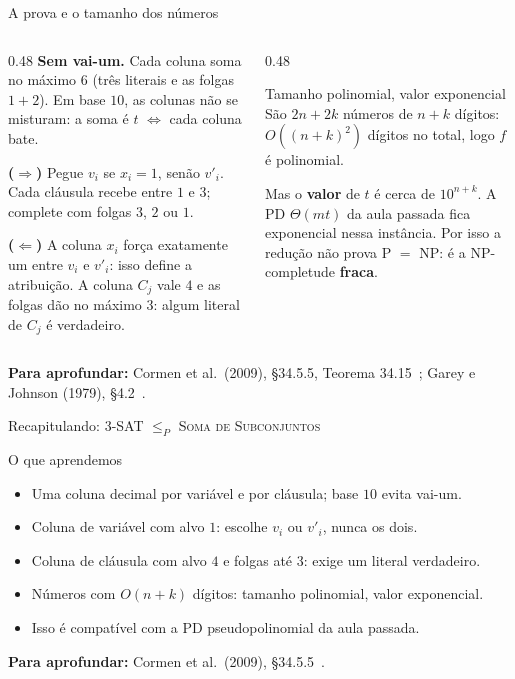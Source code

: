 \documentclass[aspectratio=169,xcolor=table]{beamer}
\newcommand{\fonte}[1]{%
  \vfill
  {\tiny\color{gray!55!black}\textbf{Para aprofundar:} #1\par}%
}
\newcommand{\prob}[1]{\textsc{#1}}
\begin{document}
\begin{frame}{A prova e o tamanho dos números}
  \begin{columns}[T]
    \begin{column}{0.48\textwidth}
      \scriptsize
      \textbf{Sem vai-um.} Cada coluna soma no máximo $6$ (três literais e as folgas $1 + 2$).
      Em base $10$, as colunas não se misturam: a soma é $t$ $\iff$ cada coluna bate.
      \medskip

      \textbf{($\Rightarrow$)} Pegue $v_i$ se $x_i = 1$, senão $v'_i$. Cada cláusula recebe
      entre $1$ e $3$; complete com folgas $3$, $2$ ou $1$.
      \medskip

      \textbf{($\Leftarrow$)} A coluna $x_i$ força exatamente um entre $v_i$ e $v'_i$: isso
      define a atribuição. A coluna $C_j$ vale $4$ e as folgas dão no máximo $3$: algum literal
      de $C_j$ é verdadeiro.
    \end{column}
    \begin{column}{0.48\textwidth}
      \begin{alertblock}{Tamanho polinomial, valor exponencial}
        \scriptsize
        São $2n + 2k$ números de $n + k$ dígitos: $O((n + k)^2)$ dígitos no total, logo $f$ é
        polinomial.
        \smallskip

        Mas o \textbf{valor} de $t$ é cerca de $10^{n + k}$. A PD $\Theta(mt)$ da aula passada
        fica exponencial nessa instância. Por isso a redução não prova P $=$ NP: é a
        NP-completude \textbf{fraca}.
      \end{alertblock}
    \end{column}
  \end{columns}
  \fonte{Cormen et al.\ (2009), \S 34.5.5, Teorema 34.15~\cite{cormen2009introduction};
    Garey e Johnson (1979), \S 4.2~\cite{garey1979computers}.}
\end{frame}

\begin{frame}{Recapitulando: \prob{3-SAT} $\le_P$ \prob{Soma de Subconjuntos}}
  \begin{block}{O que aprendemos}
    \begin{itemize}
      \item Uma coluna decimal por variável e por cláusula; base $10$ evita vai-um.
      \item Coluna de variável com alvo $1$: escolhe $v_i$ ou $v'_i$, nunca os dois.
      \item Coluna de cláusula com alvo $4$ e folgas até $3$: exige um literal verdadeiro.
      \item Números com $O(n + k)$ dígitos: tamanho polinomial, valor exponencial.
      \item Isso é compatível com a PD pseudopolinomial da aula passada.
    \end{itemize}
  \end{block}
  \fonte{Cormen et al.\ (2009), \S 34.5.5~\cite{cormen2009introduction}.}
\end{frame}
\end{document}
